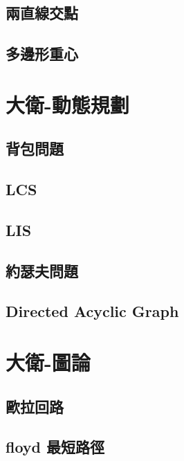 \subsection{兩直線交點}
\raggedbottom
\hrulefill
\subsection{多邊形重心}
\raggedbottom
\hrulefill

\section{大衛-動態規劃}
\subsection{背包問題}
\raggedbottom
\hrulefill
\subsection{LCS}
\raggedbottom
\hrulefill
\subsection{LIS}
\raggedbottom
\hrulefill
\subsection{約瑟夫問題}
\raggedbottom
\hrulefill
\subsection{Directed Acyclic Graph}
\raggedbottom
\hrulefill

\section{大衛-圖論}
\subsection{歐拉回路}
\raggedbottom
\hrulefill
\subsection{floyd 最短路徑}
\raggedbottom
\hrulefill
